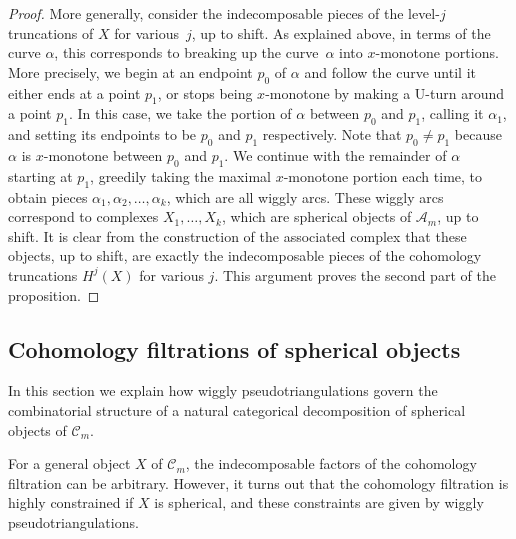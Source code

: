 \documentclass{amsart}
\theoremstyle{definition}
\begin{document}
\begin{proof}
  More generally, consider the indecomposable pieces of the level-\(j\) truncations of \(X\) for various~\(j\), up to shift.
  As explained above, in terms of the curve \(\alpha\), this corresponds to breaking up the curve~\(\alpha\) into \(x\)-monotone portions.
  More precisely, we begin at an endpoint \(p_0\) of \(\alpha\) and follow the curve until it either ends at a point \(p_1\), or stops being \(x\)-monotone by making a U-turn around a point \(p_1\).
  In this case, we take the portion of \(\alpha\) between \(p_0\) and \(p_1\), calling it \(\alpha_1\), and setting its endpoints to be \(p_0\) and \(p_1\) respectively.
  Note that \(p_0 \neq p_1\) because \(\alpha\) is \(x\)-monotone between \(p_0\) and \(p_1\).
  We continue with the remainder of \(\alpha\) starting at \(p_1\), greedily taking the maximal \(x\)-monotone portion each time, to obtain pieces \(\alpha_1,\alpha_2, \ldots, \alpha_k\), which are all wiggly arcs.
  These wiggly arcs correspond to complexes \(X_1, \ldots, X_k\), which are spherical objects of \(\mathcal{A}_m\), up to shift.
  It is clear from the construction of the associated complex that these objects, up to shift, are exactly the indecomposable pieces of the cohomology truncations \(H^j(X)\) for various \(j\).
  This argument proves the second part of the proposition.
\end{proof}


\subsection{Cohomology filtrations of spherical objects}
\label{subsec:cohomologyFiltrations}

In this section we explain how wiggly pseudotriangulations govern the combinatorial structure of a natural categorical decomposition of spherical objects of \(\mathcal{C}_m\).

For a general object \(X\) of \(\mathcal{C}_m\), the indecomposable factors of the cohomology filtration can be arbitrary.
However, it turns out that the cohomology filtration is highly constrained if \(X\) is spherical, and these constraints are given by wiggly pseudotriangulations.
\end{document}
